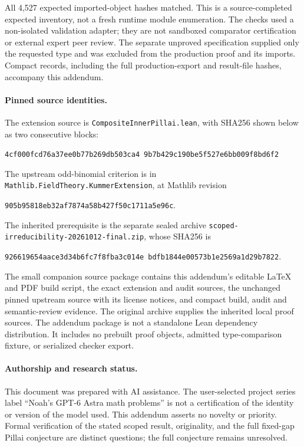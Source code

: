 \documentclass[11pt,letterpaper]{article}
\newcommand{\lean}[1]{{\small\urlstyle{tt}\nolinkurl{#1}}}
\newcommand{\hashpair}[2]{{\small\texttt{#1}\ \texttt{#2}}}
\begin{document}
All 4,527 expected imported-object hashes matched. This is a
source-completed expected inventory, not a fresh runtime module enumeration.
The checks used a non-isolated validation adapter; they are not sandboxed
comparator certification or external expert peer review. The separate
unproved specification supplied only the requested type and was excluded
from the production proof and its imports. Compact records, including the
full production-export and result-file hashes, accompany this addendum.

\paragraph{Pinned source identities.}
The extension source is \lean{CompositeInnerPillai.lean}, with SHA256
shown below as two consecutive blocks:
\begin{center}
\hashpair{4cf000fcd76a37ee0b77b269db503ca4}{9b7b429c190be5f527e6bb009f8bd6f2}
\end{center}
The upstream odd-binomial criterion is in
\lean{Mathlib.FieldTheory.KummerExtension}, at Mathlib revision
\begin{center}\small\texttt{905b95818eb32af7874a58b427f50c1711a5e96c}.\end{center}
The inherited prerequisite is the separate sealed archive
\lean{scoped-irreducibility-20261012-final.zip}, whose SHA256 is
\begin{center}
\hashpair{926619654aace3d34b6fc7f8fba3c014e}{bdfb1844e00573b1e2569a1d29b7822}.
\end{center}

The small companion source package contains this addendum's editable
LaTeX and PDF build script, the exact extension and audit sources, the
unchanged pinned upstream source with its license notices, and compact
build, audit and semantic-review evidence. The original archive supplies
the inherited local proof sources. The addendum package is not a standalone
Lean dependency distribution. It includes no prebuilt proof objects,
admitted type-comparison fixture, or serialized checker export.

\paragraph{Authorship and research status.}
This document was prepared with AI assistance. The user-selected project
series label ``Noah's GPT-6 Astra math problems'' is not a certification
of the identity or version of the model used. This addendum asserts no
novelty or priority. Formal verification of the stated scoped result,
originality, and the full fixed-gap Pillai conjecture are distinct questions;
the full conjecture remains unresolved.
\end{document}
